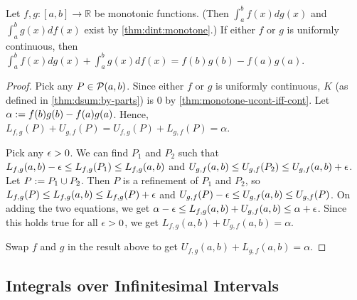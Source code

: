 \documentclass[a4paper,12pt,fleqn]{article}
\begin{document}
\begin{lemma}
\label{thm:dint:by-parts}
Let $f, g: [a, b] \to \mathbb{R}$ be monotonic functions.
(Then $\int_a^b f(x)dg(x)$ and $\int_a^b g(x)df(x)$ exist by \cref{thm:dint:monotone}.)
If either $f$ or $g$ is uniformly continuous, then
$\int_a^b f(x)dg(x) + \int_a^b g(x)df(x) = f(b)g(b) - f(a)g(a)$.
\end{lemma}
\begin{proof}
Pick any $P \in \mathcal{P}(a, b)$.
Since either $f$ or $g$ is uniformly continuous,
$K$ (as defined in \cref{thm:dsum:by-parts})
is 0 by \cref{thm:monotone-ucont-iff-cont}.
Let $\alpha := f(b)g(b)-f(a)g(a)$.
Hence, $L_{f,g}(P) + U_{g,f}(P) = U_{f,g}(P) + L_{g,f}(P) = \alpha$.

Pick any $\epsilon > 0$. We can find $P_1$ and $P_2$ such that
$L_{f,g}(a, b) - \epsilon \le L_{f,g}(P_1) \le L_{f,g}(a, b)$
and $U_{g,f}(a, b) \le U_{g,f}(P_2) \le U_{g,f}(a, b) + \epsilon$.
Let $P := P_1 \cup P_2$. Then $P$ is a refinement of $P_1$ and $P_2$,
so $L_{f,g}(P) \le L_{f,g}(a, b) \le L_{f,g}(P) + \epsilon$
and $U_{g,f}(P) - \epsilon \le U_{g,f}(a, b) \le U_{g,f}(P)$.
On adding the two equations, we get
$\alpha - \epsilon \le L_{f,g}(a, b) + U_{g,f}(a, b) \le \alpha + \epsilon$.
Since this holds true for all $\epsilon > 0$,
we get $L_{f,g}(a, b) + U_{g,f}(a, b) = \alpha$.

Swap $f$ and $g$ in the result above to get
$U_{f,g}(a, b) + L_{g,f}(a, b) = \alpha$.
\end{proof}

\subsection{Integrals over Infinitesimal Intervals}
\end{document}

